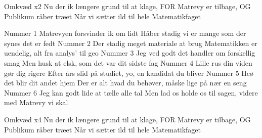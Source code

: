 \documentclass[a4paper,11pt]{article}
\begin{document}
\begin{song}
Omkvæd x2
 Nu der ik længere grund til at klage,
 FOR
Matrevy er tilbage,
OG
Publikum råber træet
Når vi sætter ild til hele Matematikfaget

 Nummer 1
Matrevyen forsvinder ik om lidt
Håber stadig vi er mange som der synes det er fedt
Nummer 2
Der stadig meget materiale at brug
Matematikken er uendelig, alt fra analys’ til geo
Nummer 3
Jeg ved godt det handler om forskellig smag
Men husk at elsk, som det var dit sidste fag 
Nummer 4
Lille rus din viden gør dig rigere
Efter års slid på studiet, yo, en kandidat du bliver
Nummer 5
Hcø det blir dit andet hjem
Der er alt hvad du behøver, måske lige på nær en seng
Nummer 6
Jeg kan godt lide at tælle alle tal
Men lad os holde os til sagen,
 videre med Matrevy vi skal

Omkvæd x4
 Nu der ik længere grund til at klage,
 FOR
Matrevy er tilbage,
OG
Publikum råber træet
Når vi sætter ild til hele Matematikfaget
\end{song}
\end{document}
